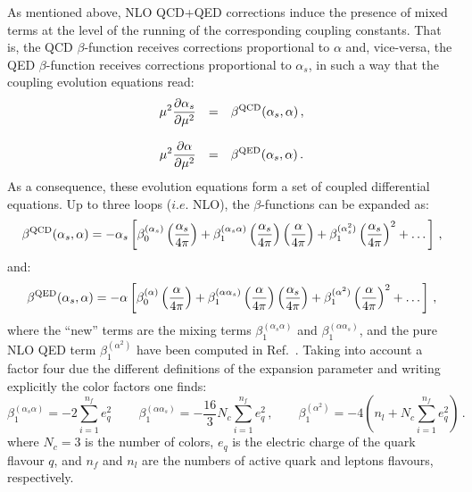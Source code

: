 As  mentioned above, NLO QCD+QED corrections induce the presence of
mixed terms at the level of the running of the
corresponding coupling constants.
%
That is,
the QCD $\beta$-function receives corrections proportional to $\alpha$
and, vice-versa, the QED $\beta$-function receives corrections
proportional to $\alpha_s$, in such a way that the coupling evolution
equations read:
\begin{equation}\label{CoupledEq}
\begin{array}{rcl}
\displaystyle \mu^2\frac{\partial \alpha_s}{\partial \mu^2} &=& \displaystyle
                                                \beta^{\rm QCD}(\alpha_s,\alpha)\,,\\
\\
\displaystyle \mu^2\frac{\partial \alpha}{\partial \mu^2} &=& \displaystyle \beta^{\rm QED}(\alpha_s,\alpha)\,.
\end{array}
\end{equation}
As a consequence, these evolution equations form a set of coupled
differential equations. Up to three loops ($i.e.$ NLO), the
$\beta$-functions can be expanded as:
\begin{equation}
\beta^{\rm QCD}(\alpha_s,\alpha) = -\alpha_s\left[\beta_0^{(\alpha_s)}\left(\frac{\alpha_s}{4\pi}\right)+\beta_1^{(\alpha_s\alpha)}\left(\frac{\alpha_s}{4\pi}\right) \left(\frac{\alpha}{4\pi}\right)+\beta_1^{(\alpha_s^2)}\left(\frac{\alpha_s}{4\pi}\right)^2+\dots\right]\,,
\end{equation}
and:
\begin{equation}
\beta^{\rm QED}(\alpha_s,\alpha) = -\alpha\left[\beta_0^{(\alpha)}\left(\frac{\alpha}{4\pi}\right)+\beta_1^{(\alpha\alpha_s)}\left(\frac{\alpha}{4\pi}\right) \left(\frac{\alpha_s}{4\pi}\right)+\beta_1^{(\alpha^2)}\left(\frac{\alpha}{4\pi}\right)^2+\dots\right]\,,
\end{equation}
where the ``new'' terms are the mixing terms
$\beta_1^{(\alpha_s\alpha)}$ and $\beta_1^{(\alpha\alpha_s)}$, and the
pure NLO QED term $\beta_1^{(\alpha^2)}$ have been computed in
Ref.~\cite{Surguladze:1996hx}. Taking into account a factor four due
the different definitions of the expansion parameter and writing
explicitly the color factors one finds:
\begin{equation}\label{eq:NewBetaTerms}
\beta_1^{(\alpha_s\alpha)} = -2\sum_{i=1}^{n_f}
e_q^2\,\qquad\beta_1^{(\alpha\alpha_s)} = -\frac{16}{3}N_c\sum_{i=1}^{n_f} e_q^2\,,\qquad \beta_1^{(\alpha^2)} = -4\left(n_l+N_c\sum_{i=1}^{n_f} e_q^2\right)\,.
\end{equation}
where $N_c=3$ is the number of colors, $e_q$ is the electric charge of
the quark flavour $q$, and $n_f$ and $n_l$ are the numbers of active
quark and leptons flavours, respectively.



